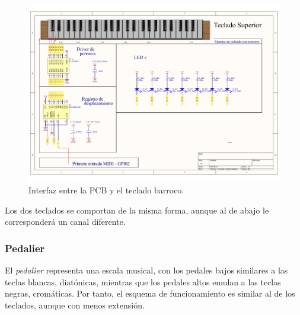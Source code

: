 \begin{figure}[H]
	\noindent \begin{centering}
		\includegraphics[width=\linewidth]{capitulo3/pcb_teclado}
		\par\end{centering}
	\smallskip
	\caption{\label{fig:pcb_teclado} Interfaz entre la \acrshort{PCB} y el teclado barroco.}
\end{figure} 

\smallskip

Los dos teclados se comportan de la misma forma, aunque al de abajo le corresponderá un canal diferente.

\subsubsection{Pedalier}

El \textit{pedalier} representa una escala musical, con los pedales bajos similares a las teclas blancas, diatónicas, mientras que los pedales altos emulan a las teclas negras, cromáticas. Por tanto, el esquema de funcionamiento es similar al de los teclados, aunque con menos extensión.

\smallskip

